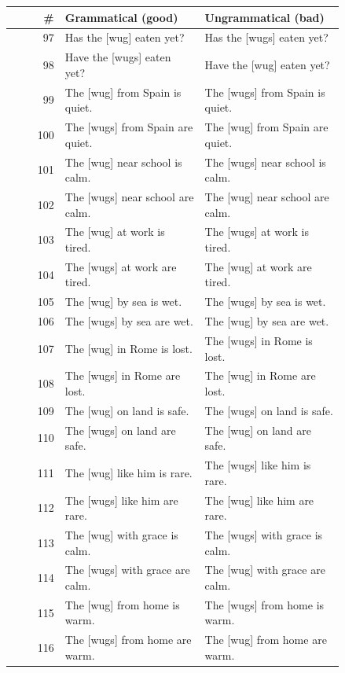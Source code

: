 \begin{table}[p]
\centering
\footnotesize
\begin{tabular}{@{}rp{0.42\linewidth}p{0.42\linewidth}@{}}
\hline
\# & Grammatical (good) & Ungrammatical (bad) \\
\hline
97 & Has the {[}wug{]} eaten yet? & Has the {[}wugs{]} eaten yet? \\
98 & Have the {[}wugs{]} eaten yet? & Have the {[}wug{]} eaten yet? \\
99 & The {[}wug{]} from Spain is quiet. & The {[}wugs{]} from Spain is quiet. \\
100 & The {[}wugs{]} from Spain are quiet. & The {[}wug{]} from Spain are quiet. \\
101 & The {[}wug{]} near school is calm. & The {[}wugs{]} near school is calm. \\
102 & The {[}wugs{]} near school are calm. & The {[}wug{]} near school are calm. \\
103 & The {[}wug{]} at work is tired. & The {[}wugs{]} at work is tired. \\
104 & The {[}wugs{]} at work are tired. & The {[}wug{]} at work are tired. \\
105 & The {[}wug{]} by sea is wet. & The {[}wugs{]} by sea is wet. \\
106 & The {[}wugs{]} by sea are wet. & The {[}wug{]} by sea are wet. \\
107 & The {[}wug{]} in Rome is lost. & The {[}wugs{]} in Rome is lost. \\
108 & The {[}wugs{]} in Rome are lost. & The {[}wug{]} in Rome are lost. \\
109 & The {[}wug{]} on land is safe. & The {[}wugs{]} on land is safe. \\
110 & The {[}wugs{]} on land are safe. & The {[}wug{]} on land are safe. \\
111 & The {[}wug{]} like him is rare. & The {[}wugs{]} like him is rare. \\
112 & The {[}wugs{]} like him are rare. & The {[}wug{]} like him are rare. \\
113 & The {[}wug{]} with grace is calm. & The {[}wugs{]} with grace is calm. \\
114 & The {[}wugs{]} with grace are calm. & The {[}wug{]} with grace are calm. \\
115 & The {[}wug{]} from home is warm. & The {[}wugs{]} from home is warm. \\
116 & The {[}wugs{]} from home are warm. & The {[}wug{]} from home are warm. \\

\end{tabular}
\end{table}
